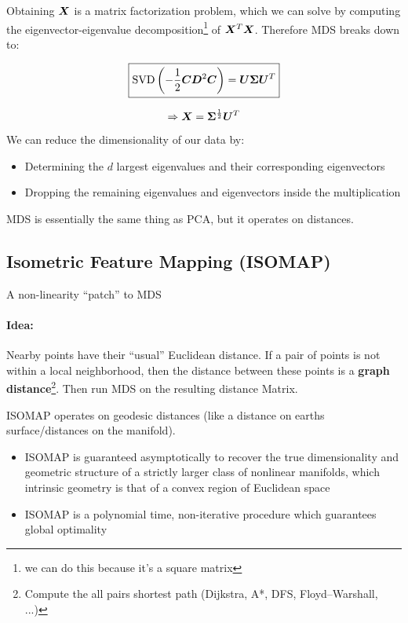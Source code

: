 Obtaining $\bm{X}$ is a matrix factorization problem, which we can solve by computing the eigenvector-eigenvalue decomposition\footnote{we can do this because it's a square matrix} of \(\bm{X}^T\bm{X}\). Therefore MDS breaks down to:

\[ \boxed{\mathrm{SVD}\left(-\frac{1}{2}\bm{C}\bm{D}^2\bm{C}\right) = \bm{U}\bm{\Sigma}\bm{U}^T}\]

\[ \Rightarrow \bm{X} = \bm{\Sigma}^{\frac{1}{2}} \bm{U}^T \]

We can reduce the dimensionality of our data by:
\begin{itemize}
    \item Determining the \(d\) largest eigenvalues and their corresponding eigenvectors
    \item Dropping the remaining eigenvalues and eigenvectors inside the multiplication
\end{itemize}

MDS is essentially the same thing as PCA, but it operates on distances.

\newpage
\subsection{Isometric Feature Mapping (ISOMAP)}
A non-linearity ``patch'' to MDS

\paragraph{Idea:} Nearby points have their ``usual'' Euclidean distance. If a pair of points is not within a local neighborhood, then the distance between these points is a \textbf{graph distance}\footnote{Compute the all pairs shortest path (Dijkstra, A*,  DFS, Floyd–Warshall, ...)}. Then run MDS on the resulting distance Matrix.

ISOMAP operates on geodesic distances (like a distance on earths surface/distances on the manifold).

\begin{itemize}
	\item ISOMAP is guaranteed asymptotically to recover the true dimensionality and geometric structure of a strictly larger class of nonlinear manifolds, which intrinsic geometry is that of a convex region of Euclidean space
	\item ISOMAP is a polynomial time, non-iterative procedure which guarantees global optimality
\end{itemize}

